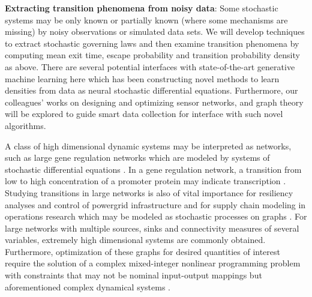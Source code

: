 \documentclass[11pt]{article}
\begin{document}

 
\textbf{Extracting transition phenomena from noisy data}:
Some   stochastic systems may be only known or partially known (where some mechanisms are missing) by   noisy observations or simulated data sets. We will  develop techniques to extract stochastic governing laws \cite{YangLi2020a} and then examine transition phenomena by computing mean exit time, escape probability and transition probability density as above. 
There are several potential interfaces with state-of-the-art generative machine learning here which has been constructing novel methods to learn densities from data as neural stochastic differential equations. Furthermore, our colleagues'  works on 
designing and optimizing sensor networks, and graph theory \cite{karwa2016statistical,Calines2008MonitoringSF} will be explored to guide smart data collection for interface with such novel algorithms. 


A class of high dimensional dynamic systems may be interpreted as networks, such as large gene regulation networks \cite{Raser2005} which are modeled by systems of stochastic differential equations \cite{Suel06}.  In a gene regulation network, a transition from low to high concentration of a promoter protein may indicate transcription \cite{Stefan,ZLDK}. Studying transitions in large networks is also of vital importance for resiliency analyses and control of powergrid infrastructure and for supply chain modeling in operations research which may be modeled as stochastic processes on graphs \cite{shin2020graph,anghel2007stochastic,nardelli2014models}. For large networks with multiple sources, sinks and connectivity measures of several variables, extremely high dimensional systems are commonly obtained. Furthermore, optimization of these graphs for desired quantities of interest require the solution of a complex mixed-integer nonlinear programming problem with constraints that may not be nominal input-output mappings but aforementioned complex dynamical systems \cite{shin2020decentralized,sampat2017optimization,kim2019graph,shin2021exponential}.
\end{document}
